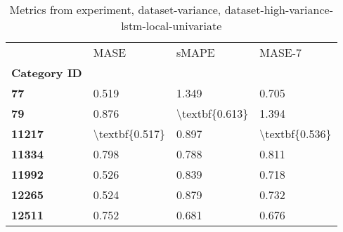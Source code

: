 \begin{table}[h]
\centering
\caption{Metrics from experiment, dataset-variance, dataset-high-variance-lstm-local-univariate}
\label{table:dataset-high-variance-lstm-local-univariate-dataset-variance}
\begin{tabular}{llll}
\toprule
{} &            MASE &           sMAPE &          MASE-7 \\
\textbf{Category ID} &                 &                 &                 \\
\midrule
\textbf{77         } &           0.519 &           1.349 &           0.705 \\
\textbf{79         } &           0.876 &  \textbackslash textbf\{0.613\} &           1.394 \\
\textbf{11217      } &  \textbackslash textbf\{0.517\} &           0.897 &  \textbackslash textbf\{0.536\} \\
\textbf{11334      } &           0.798 &           0.788 &           0.811 \\
\textbf{11992      } &           0.526 &           0.839 &           0.718 \\
\textbf{12265      } &           0.524 &           0.879 &           0.732 \\
\textbf{12511      } &           0.752 &           0.681 &           0.676 \\
\bottomrule
\end{tabular}
\end{table}
